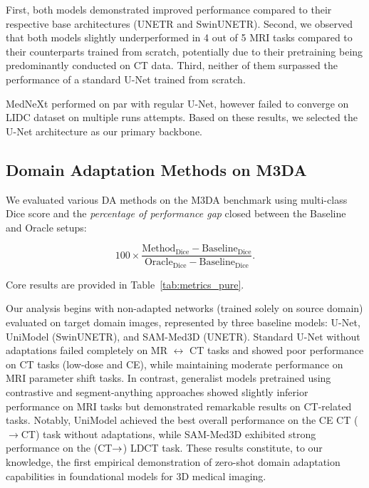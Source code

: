 

First, both models demonstrated improved performance compared to their respective base architectures (UNETR and SwinUNETR). Second, we observed that both models slightly underperformed in 4 out of 5 MRI tasks compared to their counterparts trained from scratch, potentially due to their pretraining being predominantly conducted on CT data. Third, neither of them surpassed the performance of a standard U-Net trained from scratch.

MedNeXt performed on par with regular U-Net, however failed to converge on LIDC dataset on multiple runs attempts. %
Based on these results, we selected the U-Net architecture as our primary backbone.


\subsection{Domain Adaptation Methods on M3DA}



We evaluated various DA methods on the M3DA benchmark using multi-class Dice score and the \textit{percentage of performance gap} closed between the Baseline and Oracle setups: 

\[
100\times \frac{\text{Method}_{\text{Dice}} - \text{Baseline}_{\text{Dice}}}{\text{Oracle}_{\text{Dice}} - \text{Baseline}_{\text{Dice}}}.
\]

Core results are provided in Table~\ref{tab:metrics_pure}.

%


Our analysis begins with non-adapted networks (trained solely on source domain) evaluated on target domain images, represented by three baseline models: U-Net, UniModel (SwinUNETR), and SAM-Med3D (UNETR). Standard U-Net without adaptations failed completely on MR $\leftrightarrow$ CT tasks and showed poor performance on CT tasks (low-dose and CE), while maintaining moderate performance on MRI parameter shift tasks. In contrast, generalist models pretrained using contrastive and segment-anything approaches showed slightly inferior performance on MRI tasks but demonstrated remarkable results on CT-related tasks. Notably, UniModel achieved the best overall performance on the CE CT ($\rightarrow$CT) task without adaptations, while SAM-Med3D exhibited strong performance on the (CT$\rightarrow$) LDCT task. These results constitute, to our knowledge, the first empirical demonstration of zero-shot domain adaptation capabilities in foundational models for 3D medical imaging.

